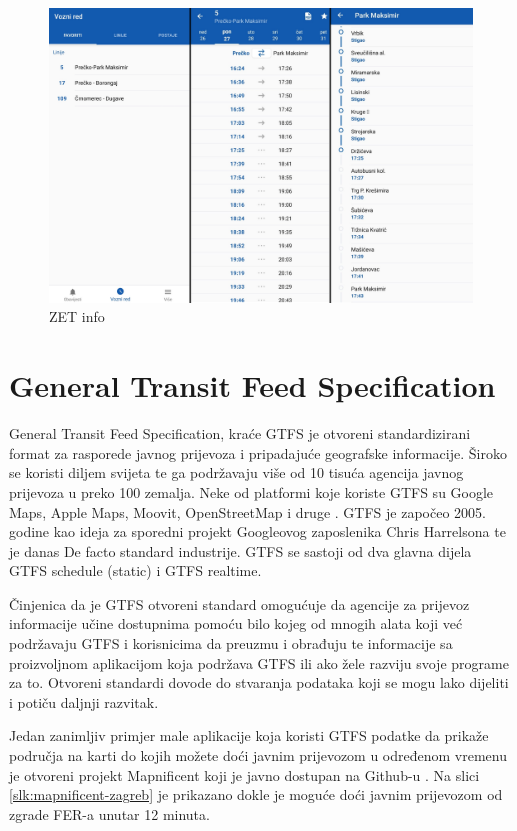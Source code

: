 \documentclass[zavrsnirad]{fer}
\begin{document}
\begin{figure}[htb]
	\centering
	\includegraphics[width=0.85\linewidth]{Figures/zetinfo.png} 
	\caption{ZET info}
	\label{slk:zet-info}
\end{figure}

\newpage
\section[GTFS]{General Transit Feed Specification}
\label{sec:GTFS}

General Transit Feed Specification, kraće GTFS je otvoreni standardizirani format za rasporede
javnog prijevoza i pripadajuće geografske informacije. Široko se koristi diljem svijeta te ga
podržavaju više od 10 tisuća agencija javnog prijevoza u preko 100 zemalja. Neke od platformi koje
koriste GTFS su Google Maps, Apple Maps, Moovit, OpenStreetMap i druge \cite{GTFS}. GTFS je započeo 2005. godine kao ideja za sporedni projekt Googleovog zaposlenika Chris Harrelsona te je danas De facto standard industrije. GTFS se sastoji od dva glavna dijela GTFS schedule (static) i GTFS realtime.

Činjenica da je GTFS otvoreni standard omogućuje da agencije za prijevoz informacije učine dostupnima pomoću bilo kojeg od mnogih alata koji već podržavaju GTFS i korisnicima da preuzmu i obrađuju te informacije sa proizvoljnom aplikacijom koja podržava GTFS ili ako žele razviju svoje programe za to. Otvoreni standardi dovode do stvaranja podataka koji se mogu lako dijeliti i potiču daljnji razvitak.

Jedan zanimljiv primjer male aplikacije koja koristi GTFS podatke da prikaže područja na karti do kojih možete doći javnim prijevozom u određenom vremenu je otvoreni projekt Mapnificent koji je javno dostupan na Github-u \cite{Mapnificent}. Na slici \ref{slk:mapnificent-zagreb} je prikazano dokle je moguće doći javnim prijevozom od zgrade FER-a unutar 12 minuta. 
\end{document}
